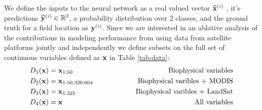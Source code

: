 \def\year{2017}\relax \documentclass[letterpaper]{article}
\begin{document}
We define the inputs to the neural network as a real valued vector $\widehat{{\bf x}}^{(i)}$ , it's predictions $\widehat{{\bf y}}^{(i)}\in \mathbb{R}^2$, a probability distribution over 2 classes, and the ground truth for a field location as ${\bf y}^{(i)}$. Since we are interested in an ablative analysis of the contributions in modeling performance from using data from satellite platforms jointly and independently we define subsets on the full set of continuous variables defined as ${\bf x}$ in Table \ref{tab:data}:
\begin{eqnarray}\label{eqn:subset}
D_1({\bf x}) &= {\bf x}_{1:50}\hspace{50pt}&\textrm{Biophysical variables}\\
D_2({\bf x})  &= {\bf x}_{1:50,326:664}\hspace{50pt}&\textrm{Biophysical varibles + MODIS}\\
D_3({\bf x})  &= {\bf x}_{1:325}\hspace{50pt}&\textrm{Biophysical varibles + LandSat}\\
D_4({\bf x}) &= {\bf x}\hspace{50pt}&\textrm{All variables}\\\label{eqn:subset2}
\end{eqnarray}
\end{document}
